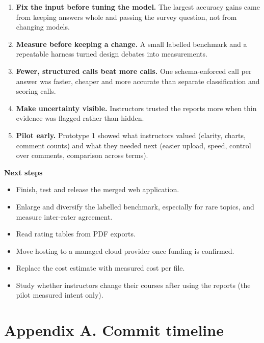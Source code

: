 \documentclass[
  11pt,
]{article}
\providecommand{\tightlist}{%
  \setlength{\itemsep}{0pt}\setlength{\parskip}{0pt}}
\begin{document}
\begin{enumerate}
\def\labelenumi{\arabic{enumi}.}
\tightlist
\item
  \textbf{Fix the input before tuning the model.} The largest accuracy gains
  came from keeping answers whole and passing the survey question, not from
  changing models.
\item
  \textbf{Measure before keeping a change.} A small labelled benchmark and a
  repeatable harness turned design debates into measurements.
\item
  \textbf{Fewer, structured calls beat more calls.} One schema-enforced call per
  answer was faster, cheaper and more accurate than separate classification and
  scoring calls.
\item
  \textbf{Make uncertainty visible.} Instructors trusted the reports more when
  thin evidence was flagged rather than hidden.
\item
  \textbf{Pilot early.} Prototype 1 showed what instructors valued (clarity,
  charts, comment counts) and what they needed next (easier upload, speed,
  control over comments, comparison across terms).
\end{enumerate}

\textbf{Next steps}

\begin{itemize}
\tightlist
\item
  Finish, test and release the merged web application.
\item
  Enlarge and diversify the labelled benchmark, especially for rare topics, and
  measure inter-rater agreement.
\item
  Read rating tables from PDF exports.
\item
  Move hosting to a managed cloud provider once funding is confirmed.
\item
  Replace the cost estimate with measured cost per file.
\item
  Study whether instructors change their courses after using the reports (the
  pilot measured intent only).
\end{itemize}

\section{Appendix A. Commit timeline}\label{appendix-a-commit-timeline}
\end{document}
